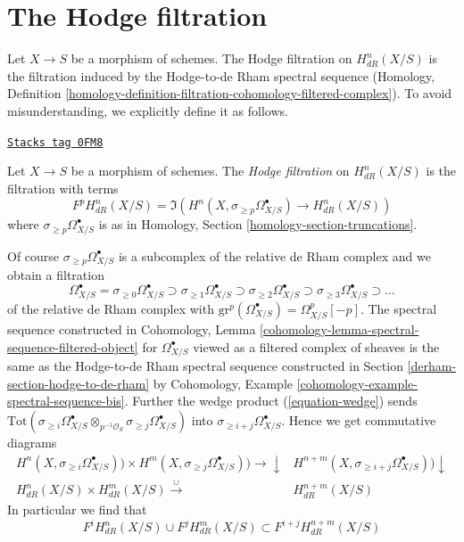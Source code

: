 \section{The Hodge filtration}
\label{derham-section-hodge-filtration}
Let $X \to S$ be a morphism of schemes. The Hodge filtration on $H^n_{dR}(X/S)$
is the filtration induced by the Hodge-to-de Rham spectral sequence
(Homology, Definition
\ref{homology-definition-filtration-cohomology-filtered-complex}).
To avoid misunderstanding, we explicitly define it as follows.

\begin{definition}
\label{derham-definition-hodge-filtration}
\href{https://stacks.math.columbia.edu/tag/0FM8}{\texttt{Stacks tag 0FM8}}

Let $X \to S$ be a morphism of schemes. The {\it Hodge filtration}
on $H^n_{dR}(X/S)$ is the filtration with terms
$$
F^pH^n_{dR}(X/S) = \Im\left(H^n(X, \sigma_{\geq p}\Omega^\bullet_{X/S})
\longrightarrow H^n_{dR}(X/S)\right)
$$
where $\sigma_{\geq p}\Omega^\bullet_{X/S}$ is as in
Homology, Section \ref{homology-section-truncations}.
\end{definition}

Of course $\sigma_{\geq p}\Omega^\bullet_{X/S}$ is a subcomplex of
the relative de Rham complex and we obtain a filtration
$$
\Omega^\bullet_{X/S} = \sigma_{\geq 0}\Omega^\bullet_{X/S} \supset
\sigma_{\geq 1}\Omega^\bullet_{X/S} \supset
\sigma_{\geq 2}\Omega^\bullet_{X/S} \supset
\sigma_{\geq 3}\Omega^\bullet_{X/S} \supset \ldots
$$
of the relative de Rham complex with
$\text{gr}^p(\Omega^\bullet_{X/S}) = \Omega^p_{X/S}[-p]$.
The spectral sequence constructed in
Cohomology, Lemma \ref{cohomology-lemma-spectral-sequence-filtered-object}
for $\Omega^\bullet_{X/S}$ viewed as a filtered complex of sheaves
is the same as the Hodge-to-de Rham spectral sequence constructed in
Section \ref{derham-section-hodge-to-de-rham} by
Cohomology, Example \ref{cohomology-example-spectral-sequence-bis}. Further the
wedge product (\ref{equation-wedge}) sends
$\text{Tot}(\sigma_{\geq i}\Omega^\bullet_{X/S} \otimes_{p^{-1}\mathcal{O}_S}
\sigma_{\geq j}\Omega^\bullet_{X/S})$ into
$\sigma_{\geq i + j}\Omega^\bullet_{X/S}$. Hence we get
commutative diagrams
$$
\begin{array}{cc}H^n(X, \sigma_{\geq i}\Omega^\bullet_{X/S}))
\times
H^m(X, \sigma_{\geq j}\Omega^\bullet_{X/S}))
\longrightarrow\downarrow & H^{n + m}(X, \sigma_{\geq i + j}\Omega^\bullet_{X/S})) \downarrow \\ H^n_{dR}(X/S) \times
H^m_{dR}(X/S)
\overset{\cup}{\longrightarrow} & H^{n + m}_{dR}(X/S)\end{array}
$$
In particular we find that
$$
F^iH^n_{dR}(X/S) \cup F^jH^m_{dR}(X/S) \subset F^{i + j}H^{n + m}_{dR}(X/S)
$$

